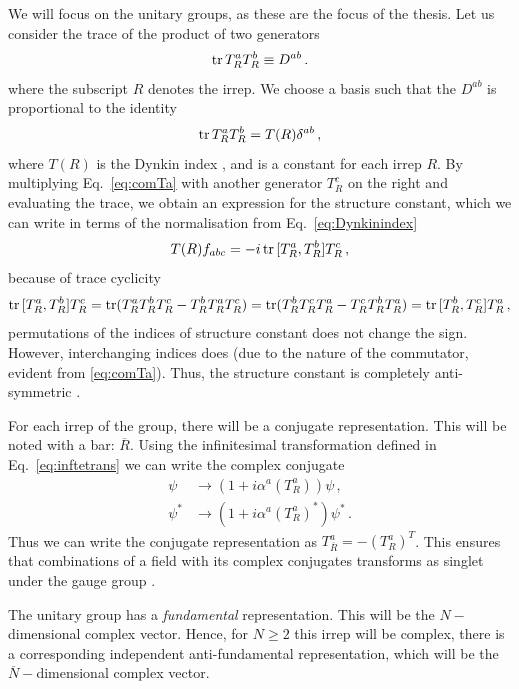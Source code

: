 We will focus on the unitary groups, as these are the focus of the thesis. Let us consider the trace of the product of two generators
\begin{align}
    \operatorname{tr} T^a_R T^b_R\equiv D^{ab}\,.
\end{align}
where the subscript $R$ denotes the irrep. We choose a basis such that the $D^{ab}$ is proportional to the identity \cite{Peskin:1995ev}
\begin{equation}
    \operatorname{tr}{T^a_R T^b_R}=T(R)\delta^{ab}\,,\label{eq:Dynkinindex}
\end{equation}
where $T(R)$ is the Dynkin index \cite{srednicki2006qft}, and is a constant for each irrep $R$. By multiplying Eq.~\eqref{eq:comTa} with another generator $T^c_R$ on the right and evaluating the trace, we obtain an expression for the structure constant, which we can write in terms of the normalisation from Eq.~\eqref{eq:Dynkinindex}
\begin{equation}
    T(R)f_{abc}=-i\operatorname{tr}{[T^a_R ,T^b_R]T^c_R}\,,\label{eq:stuctureconstant}
\end{equation}
because of trace cyclicity
\begin{align}
    \operatorname{tr}{[T^a_R ,T^b_R]T^c_R}=\operatorname{tr}(T^a_RT^b_RT^c_R-T^b_RT^a_RT^c_R)=\operatorname{tr}(T^b_RT^c_RT^a_R-T^c_RT^b_RT^a_R)=\operatorname{tr}{[T^b_R ,T^c_R]T^a_R}\,,
\end{align}
permutations of the indices of structure constant does not change the sign. However, interchanging indices does (due to the nature of the commutator, evident from \eqref{eq:comTa}). Thus, the structure constant is completely anti-symmetric \cite{Georgi:1999wka}.

For each irrep of the group, there will be a conjugate representation. This will be noted with a bar: $\overline R$. Using the infinitesimal transformation defined in Eq.~\eqref{eq:inftetrans} we can write the complex conjugate 
\begin{align}
    \psi&\to(1+i\alpha^a(T^a_R))\psi\,,\\ \psi^*&\to(1+i\alpha^a(T^a_R)^*)\psi^*\,.
\end{align}
Thus we can write the conjugate representation as $T^a_{\overline R}=-(T^a_R)^T$. This ensures that combinations of a field with its complex conjugates transforms as singlet under the gauge group \cite{Peskin:1995ev}.

The unitary group has a \textit{fundamental} representation. This will be the $N-$dimensional complex vector. Hence, for $N\ge2$ this irrep will be complex, there is a corresponding independent anti-fundamental representation, which will be the $\overline N-$dimensional complex vector. 

